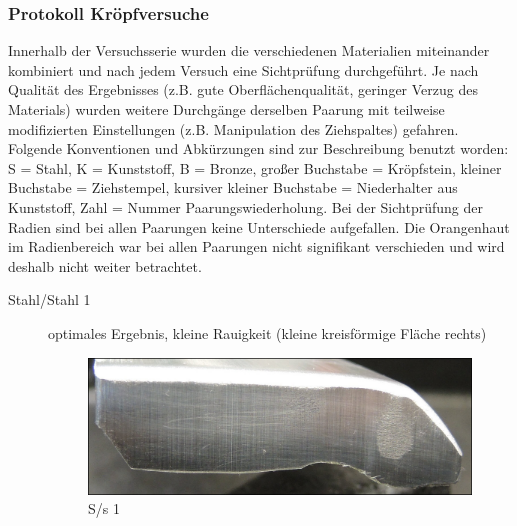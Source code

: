 \documentclass[12pt,a4paper,parskip,twoside,BCOR5mm,headsepline]{scrartcl}
\begin{document}
\begin{description*}
\subsubsection{Protokoll Kröpfversuche}
Innerhalb der Versuchsserie wurden die verschiedenen Materialien miteinander kombiniert und nach jedem Versuch eine Sichtprüfung durchgeführt. Je nach Qualität des Ergebnisses (z.B. gute Oberflächenqualität, geringer Verzug des Materials) wurden weitere Durchgänge derselben Paarung mit teilweise modifizierten Einstellungen (z.B. Manipulation des Ziehspaltes) gefahren. Folgende Konventionen und Abkürzungen sind zur Beschreibung benutzt worden: S = Stahl, K = Kunststoff, B = Bronze, großer Buchstabe = Kröpfstein, kleiner Buchstabe = Ziehstempel, kursiver kleiner Buchstabe = Niederhalter aus Kunststoff, Zahl = Nummer Paarungswiederholung. Bei der Sichtprüfung der Radien sind bei allen Paarungen keine Unterschiede aufgefallen. Die Orangenhaut im Radienbereich war bei allen Paarungen nicht signifikant verschieden und wird deshalb nicht weiter betrachtet.

\begin{description}
\item[Stahl/Stahl 1] optimales Ergebnis, kleine Rauigkeit (kleine kreisförmige Fläche rechts)
\begin{figure}[H]
\centering
\includegraphics[width=.8\textwidth]{Ss1a}
\caption{S/s 1}
\label{fig:ss1a}
\end{figure}


\end{description}
\end{description*}
\end{document}
